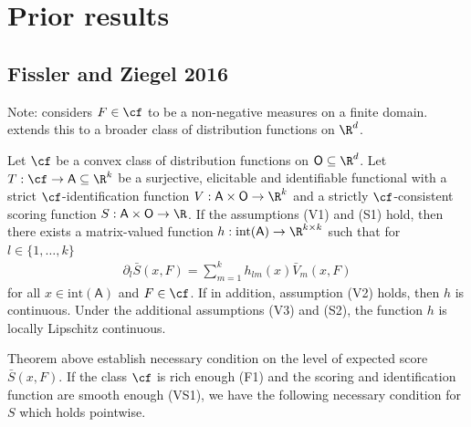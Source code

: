 \section{Prior results}


\subsection[Fissler and Ziegel 2016]{Fissler and Ziegel 2016 \cite{fissler2016multiq}}

Note: \cite{osband1985} considers $F \in \cf$ to be a non-negative measures on a finite domain. \cite{fissler2016multiq} extends this to a broader class of distribution functions on $\R^d$.

\begin{theorem}
Let $\cf$ be a convex class of distribution functions on $\mathsf{O} \subseteq \R^d$. Let $T: \cf \to \mathsf{A} \subseteq \R^k$ be a surjective, elicitable and identifiable functional with a strict $\cf$-identification function $V: \mathsf{A} \times \mathsf{O} \to \R^k$ and a strictly $\cf$-consistent scoring function $S: \mathsf{A} \times \mathsf{O} \to \R$. If the assumptions (V1) and (S1) hold, then there exists a matrix-valued function $h: \mathrm{int}(\mathsf{A}) \to \R^{k \times k}$ such that for $l \in \{1, \ldots, k\}$
\begin{align}
\partial_l \bar{S}(x, F) = \sum_{m=1}^{k} h_{lm}(x) \bar{V}_m(x, F)
\end{align}
for all $x \in \mathrm{int}(\mathsf{A})$ and $F \in \cf$. If in addition, assumption (V2) holds, then $h$ is continuous. Under the additional assumptions (V3) and (S2), the function $h$ is locally Lipschitz continuous.
\end{theorem}

Theorem above establish necessary condition on the level of expected score $\bar{S}(x,F)$. If the class $\cf$ is rich enough (F1) and the scoring and identification function are smooth enough (VS1), we have the following necessary condition for $S$ which holds pointwise.


